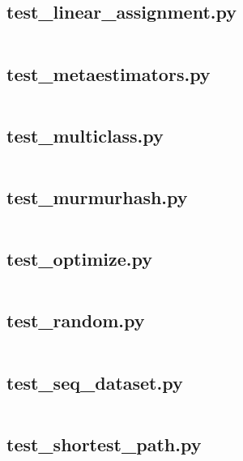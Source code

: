 \documentclass{article}
\begin{document}
\subsection{test\_linear\_assignment.py}
\inputminted{python}{/home/dufferzafar/dev/@clones/scikit-learn/sklearn/utils/tests/test_linear_assignment.py}
\newpage

\subsection{test\_metaestimators.py}
\inputminted{python}{/home/dufferzafar/dev/@clones/scikit-learn/sklearn/utils/tests/test_metaestimators.py}
\newpage

\subsection{test\_multiclass.py}
\inputminted{python}{/home/dufferzafar/dev/@clones/scikit-learn/sklearn/utils/tests/test_multiclass.py}
\newpage

\subsection{test\_murmurhash.py}
\inputminted{python}{/home/dufferzafar/dev/@clones/scikit-learn/sklearn/utils/tests/test_murmurhash.py}
\newpage

\subsection{test\_optimize.py}
\inputminted{python}{/home/dufferzafar/dev/@clones/scikit-learn/sklearn/utils/tests/test_optimize.py}
\newpage

\subsection{test\_random.py}
\inputminted{python}{/home/dufferzafar/dev/@clones/scikit-learn/sklearn/utils/tests/test_random.py}
\newpage

\subsection{test\_seq\_dataset.py}
\inputminted{python}{/home/dufferzafar/dev/@clones/scikit-learn/sklearn/utils/tests/test_seq_dataset.py}
\newpage

\subsection{test\_shortest\_path.py}
\inputminted{python}{/home/dufferzafar/dev/@clones/scikit-learn/sklearn/utils/tests/test_shortest_path.py}
\newpage
\end{document}
